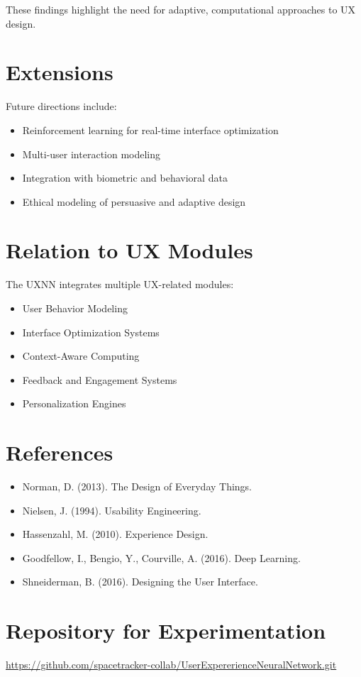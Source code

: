 \documentclass[12pt]{article}
\begin{document}
These findings highlight the need for adaptive, computational approaches to UX design.

\section{Extensions}

Future directions include:

\begin{itemize}
\item Reinforcement learning for real-time interface optimization
\item Multi-user interaction modeling
\item Integration with biometric and behavioral data
\item Ethical modeling of persuasive and adaptive design
\end{itemize}

\section{Relation to UX Modules}

The UXNN integrates multiple UX-related modules:

\begin{itemize}
\item User Behavior Modeling
\item Interface Optimization Systems
\item Context-Aware Computing
\item Feedback and Engagement Systems
\item Personalization Engines
\end{itemize}

\section{References}

\begin{itemize}
\item Norman, D. (2013). The Design of Everyday Things.
\item Nielsen, J. (1994). Usability Engineering.
\item Hassenzahl, M. (2010). Experience Design.
\item Goodfellow, I., Bengio, Y., Courville, A. (2016). Deep Learning.
\item Shneiderman, B. (2016). Designing the User Interface.
\end{itemize}

\section{Repository for Experimentation}

\noindent
\url{https://github.com/spacetracker-collab/UserExpererienceNeuralNetwork.git}
\end{document}

